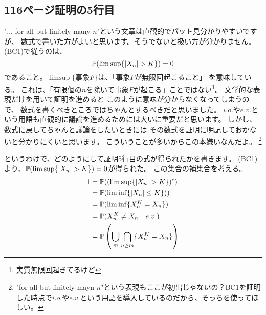   \subsection{116ページ証明の5行目}
    "... for all but finitely many $n$"という文章は直観的でパット見分かりやすいですが、
    数式で書いた方がよいと思います。そうでないと扱い方が分かりません。
    (BC1)で従うのは、
    \[
      {\mathbb{P}}(\limsup \{|X_n| > K\}) = 0
    \]
    であること。$\limsup\{\text{事象}F\}$は、「事象$F$が無限回起こること」
    を意味している。
    これは、「有限個の$n$を除いて事象$F$が起こる」ことではない\footnote{実質無限回起きてるけど}。
    文学的な表現だけを用いて証明を進めると
    このように意味が分からなくなってしまうので、
    数式を書くべきところではちゃんとするべきだと思いました。
    $i.o.$や$e.v.$という用語も直観的に議論を進めるためには大いに重要だと思います。
    しかし、数式に戻してちゃんと議論をしたいときには
    その数式を証明に明記しておかないと分かりにくいと思います。
    こういうことが多いからこの本嫌いなんだよ。
    \footnote{"for all but finitely mayn $n$"という表現もここが初出じゃないの？BC1を証明した時点で$i.o.$や$e.v.$という用語を導入しているのだから、そっちを使ってほしい。}

    というわけで、どのようにして証明5行目の式が得られたかを書きます。
    (BC1)より、${\mathbb{P}}(\limsup\{|X_n| > K\}) = 0$が得られた。
    この集合の補集合を考える。
    \begin{align*}
      1 &= {\mathbb{P}}((\limsup\{|X_n| > K\})^c) \\
      &= {\mathbb{P}}(\liminf\{|X_n| \leq K\})) \\
      &= {\mathbb{P}}(\liminf\{X_n^K = X_n\})\\
      &= {\mathbb{P}}(X_n^K \neq X_n \quad e.v.)\\
      &= {\mathbb{P}}\left(\bigcup_m \bigcap_{n \ge m}\{X_n^K = X_n\}\right)
    \end{align*}

